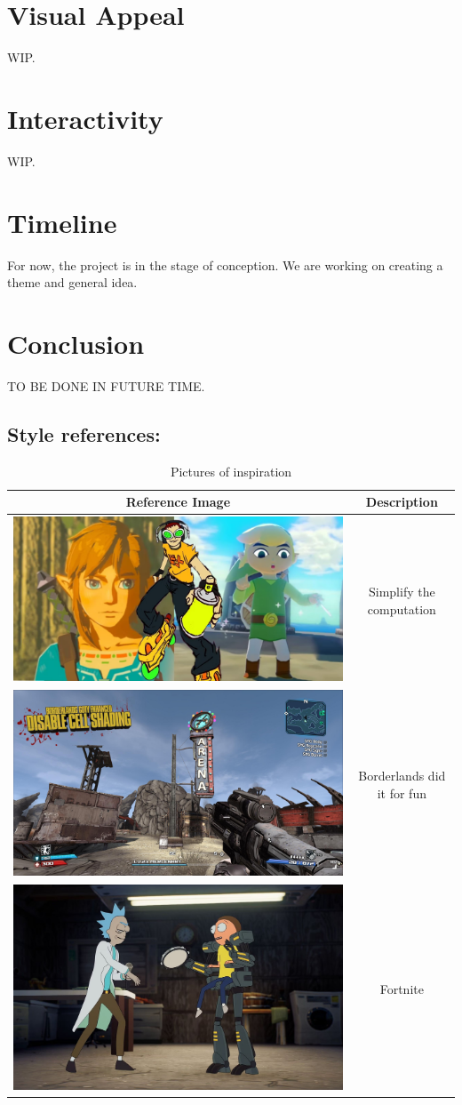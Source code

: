 \documentclass[a4paper,12pt]{article}
\begin{document}
\section*{Visual Appeal}
WIP.

\section*{Interactivity}
WIP.

\section*{Timeline}
For now, the project is in the stage of conception. We are working on creating a theme and general idea.

\section*{Conclusion}
TO BE DONE IN FUTURE TIME.

\subsection*{Style references:}
\begin{table}[h]
    \centering
    \begin{tabular}{|c|c|}
      \hline
      \textbf{Reference Image} & \textbf{Description} \\
      \hline
      \includegraphics[width=0.4\linewidth]{image1.jpg} & Simplify the computation \\
      \hline
      \includegraphics[width=0.4\linewidth]{image2.jpg} & Borderlands did it for fun \\
      \hline
      \includegraphics[width=0.4\linewidth]{image3.jpg} & Fortnite \\
      \hline
    \end{tabular}
    \caption{Pictures of inspiration}
    \label{tab:references}
  \end{table}
\end{document}
